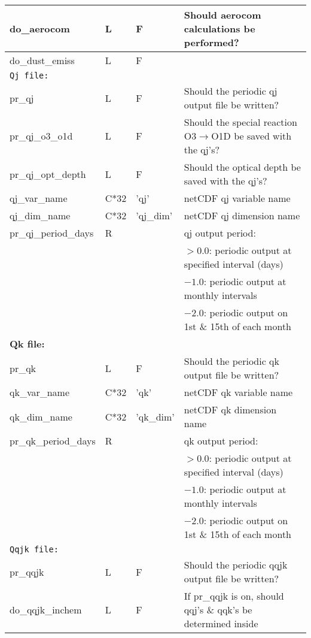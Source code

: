 {\begin{landscape}
\begin{center}
\begin{longtable}{|l|l|l|l|}
  do\_aerocom       & L & F & Should aerocom calculations be performed?  \\ \hline
  do\_dust\_emiss   & L & F &   \\ \hline
\multicolumn{4}{|l|}{\tt Qj file: }  \\ \hline
pr\_qj            & L & F & Should the periodic qj output file be written?  \\ \hline
pr\_qj\_o3\_o1d     & L & F & Should the special reaction O3$\rightarrow$O1D  be saved with the qj's?  \\ \hline
pr\_qj\_opt\_depth  & L & F & Should the optical depth be saved with the qj's?  \\ \hline
qj\_var\_name       & C*32& 'qj' &  netCDF qj variable name\\ \hline
qj\_dim\_name       & C*32& 'qj\_dim' &  netCDF qj dimension name\\ \hline
pr\_qj\_period\_days & R &   & qj output period:  \\
                          &   &      & $>0.0$:  periodic output at specified interval (days)  \\
                          &   &      & $-1.0$:  periodic output at monthly intervals  \\
                          &   &      & $-2.0$:  periodic output on 1st \& 15th of each month  \\ \hline
\multicolumn{4}{|l|}{\bf Qk file: }  \\ \hline
pr\_qk            & L & F & Should the periodic qk   output file be written?  \\ \hline
qk\_var\_name       & C*32& 'qk' &  netCDF qk variable name\\ \hline
qk\_dim\_name       & C*32& 'qk\_dim' &  netCDF qk dimension name\\ \hline
pr\_qk\_period\_days & R &   & qk output period:  \\
                          &   &      & $>0.0$:  periodic output at specified interval (days)  \\
                          &   &      & $-1.0$:  periodic output at monthly intervals  \\
                          &   &      & $-2.0$:  periodic output on 1st \& 15th of each month  \\ \hline
\multicolumn{4}{|l|}{\tt Qqjk file: }  \\ \hline
pr\_qqjk       & L & F & Should the periodic qqjk output file be written?  \\ \hline
do\_qqjk\_inchem & L & F & If pr\_qqjk is on, should qqj's \& qqk's be determined inside \\

\end{longtable}
\end{center}
\end{landscape}}
